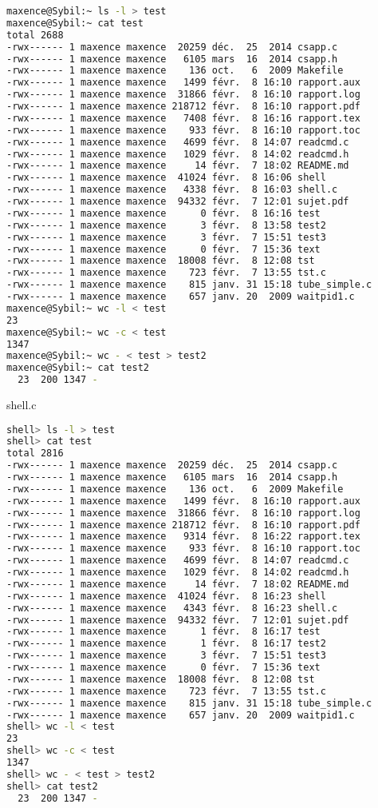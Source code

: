\documentclass{report}
\begin{document}
			\begin{lstlisting}[frame=single,basicstyle=\footnotesize,language=bash]
maxence@Sybil:~ ls -l > test
maxence@Sybil:~ cat test
total 2688
-rwx------ 1 maxence maxence  20259 déc.  25  2014 csapp.c
-rwx------ 1 maxence maxence   6105 mars  16  2014 csapp.h
-rwx------ 1 maxence maxence    136 oct.   6  2009 Makefile
-rwx------ 1 maxence maxence   1499 févr.  8 16:10 rapport.aux
-rwx------ 1 maxence maxence  31866 févr.  8 16:10 rapport.log
-rwx------ 1 maxence maxence 218712 févr.  8 16:10 rapport.pdf
-rwx------ 1 maxence maxence   7408 févr.  8 16:16 rapport.tex
-rwx------ 1 maxence maxence    933 févr.  8 16:10 rapport.toc
-rwx------ 1 maxence maxence   4699 févr.  8 14:07 readcmd.c
-rwx------ 1 maxence maxence   1029 févr.  8 14:02 readcmd.h
-rwx------ 1 maxence maxence     14 févr.  7 18:02 README.md
-rwx------ 1 maxence maxence  41024 févr.  8 16:06 shell
-rwx------ 1 maxence maxence   4338 févr.  8 16:03 shell.c
-rwx------ 1 maxence maxence  94332 févr.  7 12:01 sujet.pdf
-rwx------ 1 maxence maxence      0 févr.  8 16:16 test
-rwx------ 1 maxence maxence      3 févr.  8 13:58 test2
-rwx------ 1 maxence maxence      3 févr.  7 15:51 test3
-rwx------ 1 maxence maxence      0 févr.  7 15:36 text
-rwx------ 1 maxence maxence  18008 févr.  8 12:08 tst
-rwx------ 1 maxence maxence    723 févr.  7 13:55 tst.c
-rwx------ 1 maxence maxence    815 janv. 31 15:18 tube_simple.c
-rwx------ 1 maxence maxence    657 janv. 20  2009 waitpid1.c
maxence@Sybil:~ wc -l < test
23
maxence@Sybil:~ wc -c < test
1347
maxence@Sybil:~ wc - < test > test2
maxence@Sybil:~ cat test2
  23  200 1347 -
		\end{lstlisting}
		shell.c
		\begin{lstlisting}[frame=single,basicstyle=\footnotesize,language=bash]
shell> ls -l > test
shell> cat test
total 2816
-rwx------ 1 maxence maxence  20259 déc.  25  2014 csapp.c
-rwx------ 1 maxence maxence   6105 mars  16  2014 csapp.h
-rwx------ 1 maxence maxence    136 oct.   6  2009 Makefile
-rwx------ 1 maxence maxence   1499 févr.  8 16:10 rapport.aux
-rwx------ 1 maxence maxence  31866 févr.  8 16:10 rapport.log
-rwx------ 1 maxence maxence 218712 févr.  8 16:10 rapport.pdf
-rwx------ 1 maxence maxence   9314 févr.  8 16:22 rapport.tex
-rwx------ 1 maxence maxence    933 févr.  8 16:10 rapport.toc
-rwx------ 1 maxence maxence   4699 févr.  8 14:07 readcmd.c
-rwx------ 1 maxence maxence   1029 févr.  8 14:02 readcmd.h
-rwx------ 1 maxence maxence     14 févr.  7 18:02 README.md
-rwx------ 1 maxence maxence  41024 févr.  8 16:23 shell
-rwx------ 1 maxence maxence   4343 févr.  8 16:23 shell.c
-rwx------ 1 maxence maxence  94332 févr.  7 12:01 sujet.pdf
-rwx------ 1 maxence maxence      1 févr.  8 16:17 test
-rwx------ 1 maxence maxence      1 févr.  8 16:17 test2
-rwx------ 1 maxence maxence      3 févr.  7 15:51 test3
-rwx------ 1 maxence maxence      0 févr.  7 15:36 text
-rwx------ 1 maxence maxence  18008 févr.  8 12:08 tst
-rwx------ 1 maxence maxence    723 févr.  7 13:55 tst.c
-rwx------ 1 maxence maxence    815 janv. 31 15:18 tube_simple.c
-rwx------ 1 maxence maxence    657 janv. 20  2009 waitpid1.c
shell> wc -l < test
23
shell> wc -c < test
1347
shell> wc - < test > test2
shell> cat test2
  23  200 1347 -
		\end{lstlisting}
\end{document}
